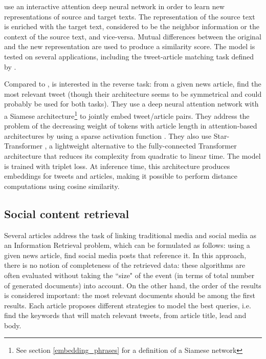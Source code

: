 \cite{zhao_interactive_2019} use an interactive attention deep neural network in order to learn new representations of source and target texts. The representation of the source text is enriched with the target text, considered to be the neighbor information or the context of the source text, and vice-versa. Mutual  differences  between the  original and the  new representation are used to produce a similarity score. The model is tested on several applications, including the tweet-article matching task defined by \cite{guo_linking_2013}.

Compared to \cite{guo_linking_2013}, \cite{danovitch2020linking} is interested in the reverse task: from a given news article, find the most relevant tweet (though their architecture seems to be symmetrical and could probably be used for both tasks). They use a deep neural attention network with a Siamese architecture\footnote{See section \ref{embedding_phrases} for a definition of a Siamese network} to jointly embed tweet/article pairs. They address the problem of the decreasing weight of tokens with article length in attention-based architectures by using a sparse activation function \citep{peters2019sparse}. They also use Star-Transformer \citep{guo2019star}, a lightweight alternative to the fully-connected Transformer architecture \citep{vaswani2017attention} that reduces its complexity from quadratic to linear time. The model is trained with triplet loss. At inference time, this architecture produces embeddings for tweets and articles, making it possible to perform distance computations using cosine similarity.

\subsection{Social content retrieval}
\label{Social content retrieval}
Several articles \citep{tsagkias_linking_2011, tanev_enhancing_2012, suarez2018data} address the task of linking traditional media and social media as an Information Retrieval problem, which can be formulated as follows: using a given news article, find social media posts that reference it. In this approach, there is no notion of completeness of the retrieved data: these algorithms are often evaluated without taking the ``size" of the event (in terms of total number of generated documents) into account. On the other hand, the order of the results is considered important: the most relevant documents should be among the first results. Each article proposes different strategies to model the best queries, i.e. find the keywords that will match relevant tweets, from article title, lead and body.

